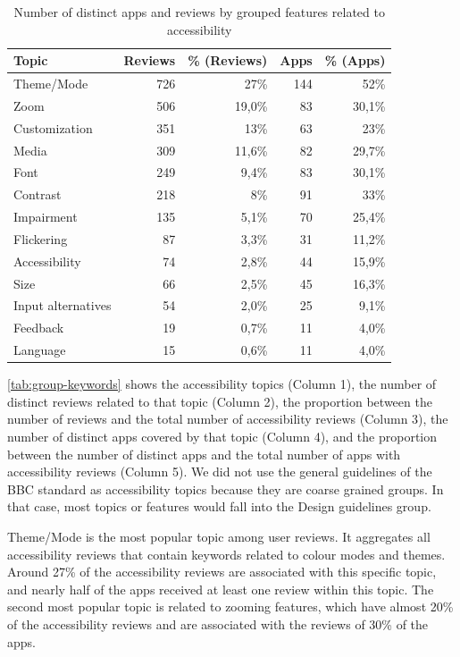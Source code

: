 \begin{table}[]
\centering
\caption{Number of distinct apps and reviews by grouped features related to accessibility}
\small
\label{tab:group-keywords}
\begin{tabular}{lrrrr}
\hline
Topic         & Reviews & \% (Reviews) & Apps & \% (Apps) \\
\hline
Theme/Mode    & 726     & 27\%     & 144  & 52\%  \\
Zoom          & 506     & 19,0\%     & 83   & 30,1\%  \\
Customization & 351     & 13\%     & 63   & 23\%  \\
Media         & 309     & 11,6\%     & 82   & 29,7\%  \\
Font          & 249     & 9,4\%      & 83   & 30,1\%  \\
Contrast      & 218     & 8\%        & 91  & 33\%  \\
Impairment    & 135     & 5,1\%      & 70   & 25,4\%  \\
Flickering    & 87      & 3,3\%      & 31   & 11,2\%  \\
Accessibility & 74      & 2,8\%      & 44   & 15,9\%  \\
Size          & 66      & 2,5\%      & 45   & 16,3\%  \\
Input alternatives        & 54      & 2,0\%      & 25   & 9,1\%   \\
Feedback      & 19      & 0,7\%      & 11   & 4,0\%   \\
Language      & 15      & 0,6\%      & 11   & 4,0\%  \\
\hline
\end{tabular}
\end{table}

\autoref{tab:group-keywords} shows the accessibility topics (Column 1), the number of distinct reviews related to that topic (Column 2), the proportion between the number of reviews and the total number of accessibility reviews (Column 3), the number of distinct apps covered by that topic (Column 4), and the proportion between the number of distinct apps and the total number of apps with accessibility reviews (Column 5).
We did not use the general guidelines of the BBC standard as accessibility topics because they are coarse grained groups. In that case, most topics or features would fall into the Design guidelines group.


Theme/Mode is the most popular topic among user reviews.
It aggregates all accessibility reviews that contain keywords related to colour modes and themes. Around 27\% of the accessibility reviews are associated with this specific topic, and nearly half of the apps received at least one review within this topic.
The second most popular topic is related to zooming features, which have almost 20\% of the accessibility reviews and are associated with the reviews of 30\% of the apps.

